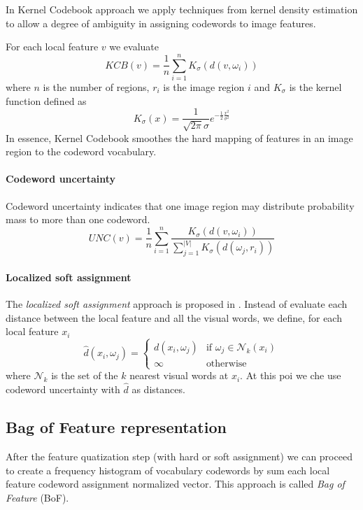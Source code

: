 In Kernel Codebook approach we apply techniques from kernel density estimation to allow a degree of ambiguity in assigning codewords to image features. 

For each local feature $v$ we evaluate
\begin{equation}
KCB(v) = \frac{1}{n} \sum_{i = 1}^{n} K_{\sigma}(d(v, \omega_i))
\end{equation}
where $n$ is the number of regions, $r_i$ is the image region $i$ and $K_{\sigma}$ is the kernel function defined as
\begin{equation}
K_{\sigma} (x) = \frac{1}{\sqrt{2\pi} \sigma} e^{- \frac{1}{2} \frac{x^2}{\sigma^2}}
\end{equation}
In essence, Kernel Codebook smoothes the hard mapping of features in an image region to the codeword vocabulary.

\paragraph{Codeword uncertainty}

Codeword uncertainty indicates that one image region may distribute probability mass to more than one codeword.
\begin{equation}
UNC(v) = \frac{1}{n} \sum_{i = 1}^{n} \frac{K_{\sigma}(d(v, \omega_i))}{\sum_{j=1}^{|V|} K_{\sigma}(d(\omega_j, r_i))}
\end{equation}

\paragraph{Localized soft assignment}

The \emph{localized soft assignment} approach is proposed in \cite{LingqiaoLiu:2011:DSC:2355573.2356438}. Instead of evaluate each distance between the local feature and all the visual words, we define, for each local feature $x_i$
\begin{equation}
\hat{d}(x_i, \omega_j) =
\left\{
\begin{array}{ll}
d(x_i, \omega_j) & \mbox{if } \omega_j \in \mathcal{N}_k(x_i) \\
\infty & \mbox{otherwise}
\end{array}
\right.
\end{equation}
where $\mathcal{N}_k$ is the set of the $k$ nearest visual words at $x_i$. At this poi we che use codeword uncertainty with $\hat{d}$ as distances.

\subsection{Bag of Feature representation}

After the feature quatization step (with hard or soft assignment) we can proceed to create a frequency histogram of vocabulary codewords by sum each local feature codeword assignment normalized vector. This approach is called \emph{Bag of Feature} (BoF).




